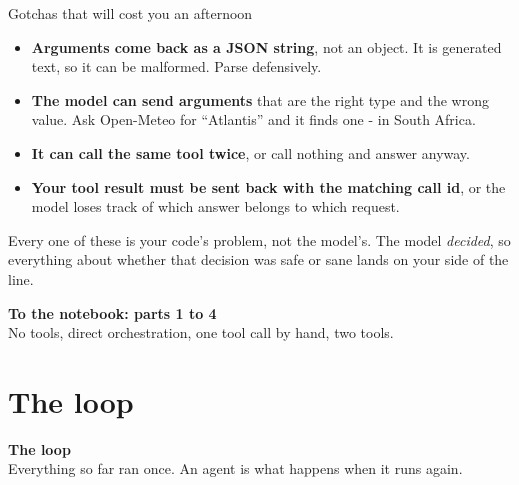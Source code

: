 \documentclass[aspectratio=169]{beamer}
\newcommand{\trapbox}[1]{%
  \begin{tcolorbox}[colback=armred!8, colframe=armred, boxrule=0.6pt, arc=2pt]
  #1
  \end{tcolorbox}}
\newcommand{\sectiontransition}[2]{%
  \begin{frame}[plain]
    \vfill
    \begin{center}
      {\Huge\bfseries\color{popblue} #1}\\[1.1em]
      {\large #2}
    \end{center}
    \vfill
  \end{frame}}
\newcommand{\notebookframe}[2]{%
  \begin{frame}[plain]
    \vfill
    \begin{center}
      {\Large\bfseries\color{paramgreen} To the notebook: #1}\\[1.0em]
      {\large #2}
    \end{center}
    \vfill
  \end{frame}}
\begin{document}
\begin{frame}{Gotchas that will cost you an afternoon}
  \vspace{0.6em}
  \begin{itemize}
    \item \textbf{Arguments come back as a JSON string}, not an object. It is generated text, so
      it can be malformed. Parse defensively.
    \item \textbf{The model can send arguments} that are the right type and the wrong value. Ask
      Open-Meteo for ``Atlantis'' and it finds one - in South Africa.
    \item \textbf{It can call the same tool twice}, or call nothing and answer anyway.
    \item \textbf{Your tool result must be sent back with the matching call id}, or the model
      loses track of which answer belongs to which request.
  \end{itemize}

  \vspace{0.8em}
  \trapbox{Every one of these is your code's problem, not the model's. The model
  \emph{decided}, so everything about whether that decision was safe or sane lands on your side of
  the line.}
\end{frame}

\notebookframe{parts 1 to 4}{No tools, direct orchestration, one tool call by hand, two tools.}

\section{The loop}
\sectiontransition{The loop}{Everything so far ran once. An agent is what happens when it runs
again.}
\end{document}
